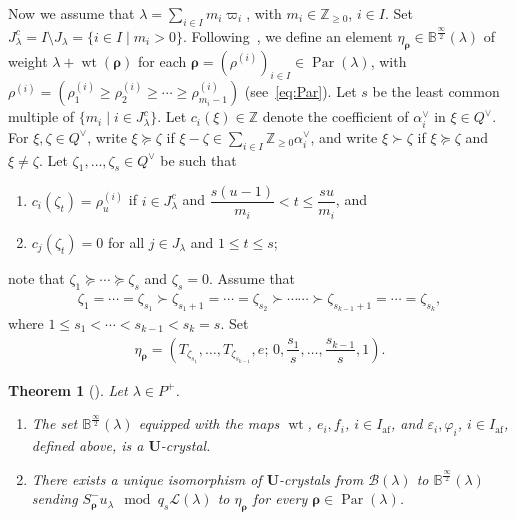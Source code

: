 \documentclass[10pt]{amsart}
\newtheorem{theo}{Theorem}[section]
\theoremstyle{definition}\newtheorem{defi}[theo]{Definition}
\theoremstyle{remark}\newtheorem{rema}[theo]{Remark}
\newcommand{\BZ}{\mathbb{Z}}
\newcommand\bmrho[1]{\boldsymbol{#1}}
\newcommand{\U}{\mathbf{U}}
\newcommand{\si}{\frac{\infty}{2}}
\DeclareMathOperator{\af}{af}
\DeclareMathOperator{\wt}{wt}
\DeclareMathOperator{\Par}{Par}
\begin{document}
Now we assume that 
$\lambda = \sum_{i \in I} m_i \varpi_i$, 
with 
$m_i \in \BZ_{\geq 0}$, 
$i \in I$. 
Set 
$J_{\lambda}^c = I \setminus J_{\lambda} = \{ i \in I \mid m_i > 0 \}$. 
Following~\cite[Equation~(7.2.2)]{INS16}, 
we define an element 
$\eta_{\bmrho{\rho}} \in \mathbb{B}^{\si}(\lambda)$ 
of weight 
$\lambda + \wt (\bmrho{\rho})$
for each 
$\bmrho{\rho} = \left( \rho^{(i)} \right)_{i \in I} \in \Par (\lambda)$, 
with 
$\rho^{(i)} = \left(\rho^{(i)}_1 \geq \rho^{(i)}_2 \geq \cdots \geq \rho^{(i)}_{m_i-1}\right)$
(see~\eqref{eq:Par}). 
Let 
$s$ 
be the least common multiple of 
$\{ m_i \mid i \in J_{\lambda}^c \}$. 
Let 
$c_i (\xi) \in \BZ$ 
denote the coefficient of 
$\alpha_i^{\vee}$ 
in 
$\xi \in Q^{\vee}$.
For 
$\xi , \zeta \in Q^{\vee}$, 
write 
$\xi \succeq \zeta$ 
if 
$\xi - \zeta \in \sum_{i \in I} \BZ_{\geq 0} \alpha_i^{\vee}$, 
and write 
$\xi \succ \zeta$
if 
$\xi \succeq \zeta$ 
and 
$\xi \neq \zeta$. 
Let 
$\zeta_1 , \ldots , \zeta_s \in Q^{\vee}$
be such that 
\begin{enumerate}[label=(\roman*)]
\item
$c_i(\zeta_t) = \rho^{(i)}_u$ 
if $i \in J_{\lambda}^c$ 
and $\dfrac{s(u-1)}{m_i} < t \leq \dfrac{su}{m_i}$, and 
\item
$c_j(\zeta_t) = 0$ 
for all $j \in J_{\lambda}$ and $1 \leq t \leq s$; 
\end{enumerate}
note that 
$\zeta_1 \succeq \cdots \succeq \zeta_s$
and 
$\zeta_s = 0$. 
Assume that
\begin{align}
\zeta_1 = \cdots = \zeta_{s_1} \succ \zeta_{s_1 + 1} = \cdots = \zeta_{s_2} \succ \cdots \cdots 
\succ \zeta_{s_{k-1} + 1} = \cdots = \zeta_{s_k}, 
\end{align}
where 
$1 \leq s_1 < \cdots < s_{k-1} < s_k = s$.
Set 
\begin{align}
\eta_{\bmrho{\rho}} 
=
\left( 
T_{\zeta_{s_1}} , \ldots , T_{\zeta_{s_{k-1}}} , e ; \, 
0 , \dfrac{s_1}{s} , \ldots , \dfrac{s_{k-1}}{s} , 1
\right) .
\end{align}

\begin{theo}[{\cite[Theorems~3.1.5 and~3.2.1]{INS16}}] \label{thm:SiLS-isom}
Let $\lambda \in P^+$.
\begin{enumerate}[label=(\arabic*)]
\item\label{Theo2.7_1}
The set
$\mathbb{B}^{\si}(\lambda)$
equipped with the maps 
$\wt $, 
$e_i , f_i$, $i \in I_{\af}$, and
$\varepsilon_i , \varphi_i$, $i \in I_{\af}$, 
defined above, is a $\U$-crystal. 
\item\label{Theo2.7_2}
There exists a unique 
isomorphism of $\U$-crystals from 
$\mathcal{B}(\lambda)$
to 
$\mathbb{B}^{\si}(\lambda)$
sending 
$S_{\bmrho{\rho}}^- u_{\lambda} \mod q_s \mathcal{L}(\lambda)$ 
to 
$\eta_{\bmrho{\rho}}$
for every 
$\bmrho{\rho} \in \Par (\lambda)$. 
\end{enumerate}
\end{theo}
\end{document}

